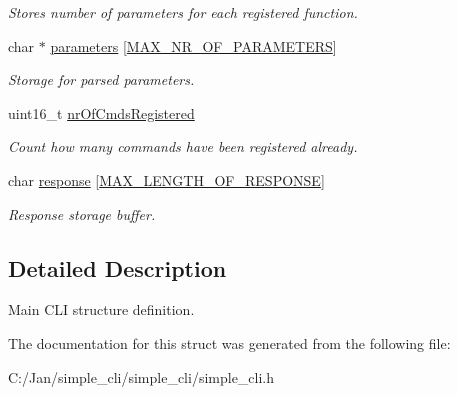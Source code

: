 \begin{DoxyCompactItemize}
\begin{DoxyCompactList}\small\item\em Stores number of parameters for each registered function. \end{DoxyCompactList}\item 
\hypertarget{struct__cli__t_a51e40c51fa276e7cc13a3e399c6b29e2}{char $\ast$ \hyperlink{struct__cli__t_a51e40c51fa276e7cc13a3e399c6b29e2}{parameters} \mbox{[}\hyperlink{group___s_i_m_p_l_e___c_l_i_gad8bacdd29d97762d63a242cba6444b32}{M\+A\+X\+\_\+\+N\+R\+\_\+\+O\+F\+\_\+\+P\+A\+R\+A\+M\+E\+T\+E\+R\+S}\mbox{]}}\label{struct__cli__t_a51e40c51fa276e7cc13a3e399c6b29e2}

\begin{DoxyCompactList}\small\item\em Storage for parsed parameters. \end{DoxyCompactList}\item 
\hypertarget{struct__cli__t_a644332672d347d16da5f567c1401ea33}{uint16\+\_\+t \hyperlink{struct__cli__t_a644332672d347d16da5f567c1401ea33}{nr\+Of\+Cmds\+Registered}}\label{struct__cli__t_a644332672d347d16da5f567c1401ea33}

\begin{DoxyCompactList}\small\item\em Count how many commands have been registered already. \end{DoxyCompactList}\item 
\hypertarget{struct__cli__t_a00caea38300895956a4d6b7e90e95232}{char \hyperlink{struct__cli__t_a00caea38300895956a4d6b7e90e95232}{response} \mbox{[}\hyperlink{group___s_i_m_p_l_e___c_l_i_ga17e61582091ee023dd2d011f13e8f971}{M\+A\+X\+\_\+\+L\+E\+N\+G\+T\+H\+\_\+\+O\+F\+\_\+\+R\+E\+S\+P\+O\+N\+S\+E}\mbox{]}}\label{struct__cli__t_a00caea38300895956a4d6b7e90e95232}

\begin{DoxyCompactList}\small\item\em Response storage buffer. \end{DoxyCompactList}\end{DoxyCompactItemize}


\subsection{Detailed Description}
Main C\+L\+I structure definition. 

The documentation for this struct was generated from the following file\+:\begin{DoxyCompactItemize}
\item 
C\+:/\+Jan/simple\+\_\+cli/simple\+\_\+cli/simple\+\_\+cli.\+h\end{DoxyCompactItemize}
